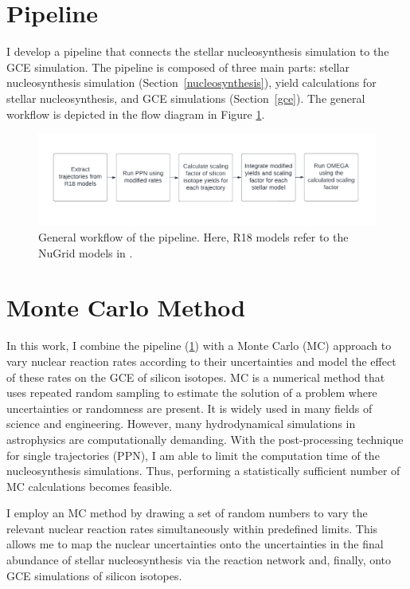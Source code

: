 \documentclass{brandeis-thesis3.2}
\begin{document}
\section{Pipeline} \label{pipeline}
I develop a pipeline that connects the stellar nucleosynthesis simulation to the GCE simulation. The pipeline is composed of three main parts: stellar nucleosynthesis simulation (Section~\ref{nucleosynthesis}), yield calculations for stellar nucleosynthesis, and GCE simulations (Section~\ref{gce}). The general workflow is depicted in  the flow diagram in Figure \ref{fig:workflow}.

\begin{figure}[H]
\centering
\includegraphics[width=\textwidth]{figs/Flowchart.pdf}
\caption{General workflow of the pipeline. Here, R18 models refer to the NuGrid models in \cite{Ritter_2018}.}
\label{fig:workflow}
\end{figure}

\section{Monte Carlo Method} \label{mc}
In this work, I combine the pipeline (\ref{pipeline}) with a Monte Carlo (MC) approach to vary nuclear reaction rates according to their uncertainties and model the effect of these rates on the GCE of silicon isotopes. MC is a numerical method that uses repeated random sampling to estimate the solution of a problem where uncertainties or randomness are present. It is widely used in many fields of science and engineering. However, many hydrodynamical simulations in astrophysics are computationally demanding. With the post-processing technique for single trajectories (PPN), I am able to limit the computation time of the nucleosynthesis simulations. Thus, performing a statistically sufficient number of MC calculations becomes feasible. 

I employ an MC method by drawing a set of random numbers to vary the relevant nuclear reaction rates simultaneously within predefined limits. This allows me to map the nuclear uncertainties onto the uncertainties in the final abundance of stellar nucleosynthesis via the reaction network and, finally, onto GCE simulations of silicon isotopes. 
\end{document}
